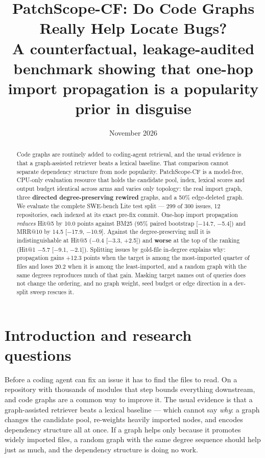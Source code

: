 \documentclass[10pt,a4paper]{article}
\title{\textbf{PatchScope-CF: Do Code Graphs Really Help Locate Bugs?}\\[0.3em]\large A counterfactual, leakage-audited benchmark showing that one-hop import propagation is a popularity prior in disguise}
\author{}
\date{November 2026}
\begin{document}
\maketitle
\vspace{-2.5em}


\begin{abstract}
\noindent Code graphs are routinely added to coding-agent retrieval, and the usual evidence is that a graph-assisted retriever beats a lexical baseline. That comparison cannot separate dependency structure from node popularity. PatchScope-CF is a model-free, CPU-only evaluation resource that holds the candidate pool, index, lexical scores and output budget identical across arms and varies only topology: the real import graph, three \textbf{directed degree-preserving rewired} graphs, and a 50\% edge-deleted graph. We evaluate the complete SWE-bench Lite test split --- 299 of 300 issues, 12 repositories, each indexed at its exact pre-fix commit. One-hop import propagation \textit{reduces} Hit@5 by 10.0 points against BM25 (95\% paired bootstrap [$-$14.7, $-$5.4]) and MRR@10 by 14.5 [$-$17.9, $-$10.9]. Against the degree-preserving null it is indistinguishable at Hit@5 ($-$0.4 [$-$3.3, +2.5]) and \textbf{worse} at the top of the ranking (Hit@1 $-$5.7 [$-$9.1, $-$2.1]). Splitting issues by gold-file in-degree explains why: propagation gains +12.3 points when the target is among the most-imported quarter of files and loses 20.2 when it is among the least-imported, and a random graph with the same degrees reproduces much of that gain. Masking target names out of queries does not change the ordering, and no graph weight, seed budget or edge direction in a dev-split sweep rescues it.
\end{abstract}

\section{Introduction and research questions}
Before a coding agent can fix an issue it has to find the files to read. On a repository with thousands of modules that step bounds everything downstream, and code graphs are a common way to improve it. The usual evidence is that a graph-assisted retriever beats a lexical baseline --- which cannot say \textit{why}: a graph changes the candidate pool, re-weights heavily imported nodes, and encodes dependency structure all at once. If a graph helps only because it promotes widely imported files, a random graph with the same degree sequence should help just as much, and the dependency structure is doing no work.
\end{document}
